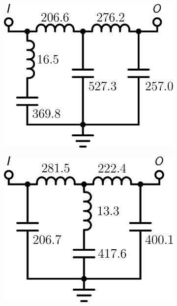 \begin{figure}[h!]
\begin{subfigure}[t]{0.25\textwidth}
\centering
\includegraphics[scale = 0.14]{../app2/figures/(5)}
\caption{}
\end{subfigure}%
\begin{subfigure}[t]{0.25\textwidth}
\centering
\includegraphics[scale = 0.14]{../app2/figures/(7)}
\caption{}
\end{subfigure}%
\begin{subfigure}[t]{0.25\textwidth}
\centering

\end{subfigure}
\end{figure}
